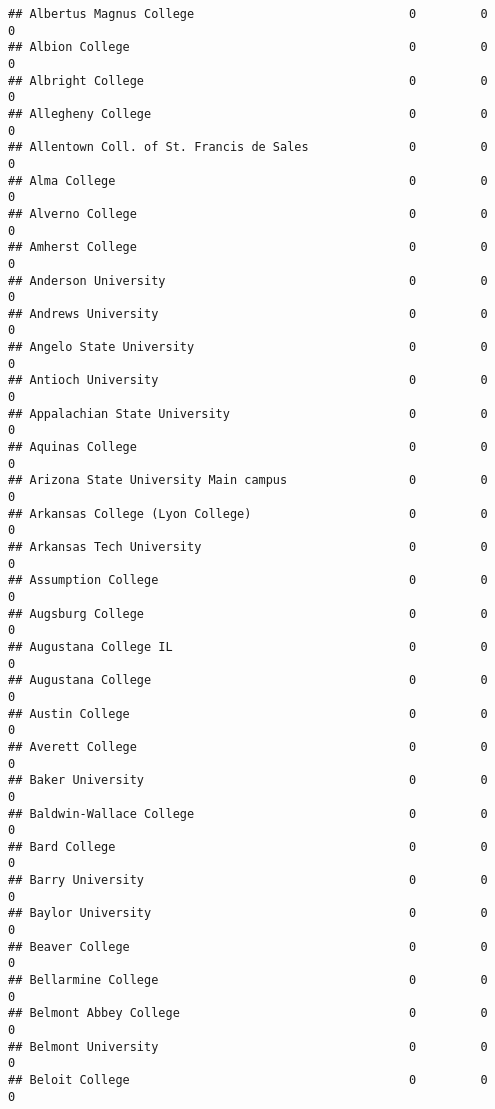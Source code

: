 \documentclass[
]{article}
\begin{document}
\begin{verbatim}
## Albertus Magnus College                              0         0           0
## Albion College                                       0         0           0
## Albright College                                     0         0           0
## Allegheny College                                    0         0           0
## Allentown Coll. of St. Francis de Sales              0         0           0
## Alma College                                         0         0           0
## Alverno College                                      0         0           0
## Amherst College                                      0         0           0
## Anderson University                                  0         0           0
## Andrews University                                   0         0           0
## Angelo State University                              0         0           0
## Antioch University                                   0         0           0
## Appalachian State University                         0         0           0
## Aquinas College                                      0         0           0
## Arizona State University Main campus                 0         0           0
## Arkansas College (Lyon College)                      0         0           0
## Arkansas Tech University                             0         0           0
## Assumption College                                   0         0           0
## Augsburg College                                     0         0           0
## Augustana College IL                                 0         0           0
## Augustana College                                    0         0           0
## Austin College                                       0         0           0
## Averett College                                      0         0           0
## Baker University                                     0         0           0
## Baldwin-Wallace College                              0         0           0
## Bard College                                         0         0           0
## Barry University                                     0         0           0
## Baylor University                                    0         0           0
## Beaver College                                       0         0           0
## Bellarmine College                                   0         0           0
## Belmont Abbey College                                0         0           0
## Belmont University                                   0         0           0
## Beloit College                                       0         0           0

\end{verbatim}
\end{document}
